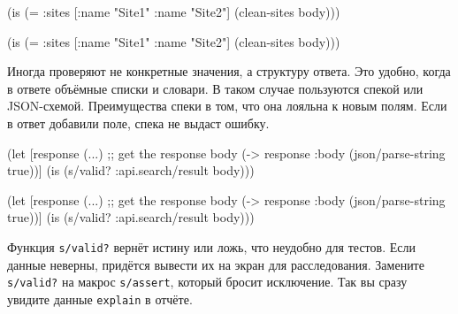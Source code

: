 \ifx\devicetype\mobile

\begin{english}
  \begin{clojure}
(is (= {:sites [{:name "Site1"}
                {:name "Site2"}]}
       (clean-sites body)))
  \end{clojure}
\end{english}

\else

\begin{english}
  \begin{clojure}
(is (= {:sites [{:name "Site1"} {:name "Site2"}]}
       (clean-sites body)))
  \end{clojure}
\end{english}

\fi

Иногда проверяют не конкретные значения, а структуру ответа. Это удобно, когда в
ответе объёмные списки и словари. В таком случае пользуются спекой или
JSON-схемой. Преимущества спеки в том, что она лояльна к новым полям. Если в
ответ добавили поле, спека не выдаст ошибку.


\ifx\devicetype\mobile

\begin{english}
  \begin{clojure}
(let [response (...) ;; get the response
      body (-> response
               :body
               (json/parse-string
                 true))]
  (is (s/valid? :api.search/result
                body)))
  \end{clojure}
\end{english}

\else

\begin{english}
  \begin{clojure}
(let [response (...) ;; get the response
      body (-> response :body (json/parse-string true))]
  (is (s/valid? :api.search/result body)))
  \end{clojure}
\end{english}

\fi

Функция \verb|s/valid?| вернёт истину или ложь, что неудобно для тестов. Если
данные неверны, придётся вывести их на экран для расследования. Замените
\verb|s/valid?| на макрос \verb|s/assert|, который бросит исключение. Так
вы сразу увидите данные \verb|explain| в отчёте.

